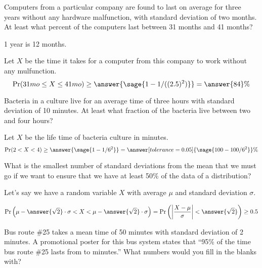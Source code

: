 \documentclass{ximera}
\begin{document}
\begin{problem}
Computers from a particular company are found to last on average for three years without any hardware malfunction, with standard deviation of two months. At least what percent of the computers last between 31 months and 41 months?
\begin{hint}
1 year is 12 months.
\end{hint}
\begin{prompt}
Let $X$ be the time it takes  for a computer from this company to work without any mulfunction.
$$\Pr(31mo\leq X \leq 41mo)\geq\answer{\sage{1 - 1/((2.5)^2)}}=\answer{84}\%$$

\end{prompt}
\end{problem}



\begin{problem}
Bacteria in a culture live for an average time of three hours with standard deviation of 10 minutes. At least what fraction of the bacteria live between two and four hours?
\begin{prompt}
Let $X$ be the life time of bacteria culture in minutes.
$$\Pr(2<X<4)\geq \answer{ \sage{1-1/6^2}}=\answer[tolerance=0.05]{ \sage{100-100/6^2}}\%$$
\end{prompt}
\end{problem}


\begin{problem}
What is the smallest number of standard deviations from the mean that we must go if we want to ensure that we have at least 50\% of the data of a distribution?
\begin{prompt}
Let's say we have a random variable $X$ with average $\mu$ and standard deviation $\sigma$. 

$$\Pr\left(\mu-\answer{\sqrt{2}}\cdot \sigma< X < \mu-\answer{\sqrt{2}}\cdot \sigma \right)=\Pr\left(\left|\frac{X-\mu}{\sigma}\right|<\answer{\sqrt{2}}\right)\geq 0.5 $$
\end{prompt}
\end{problem}

\begin{problem}

Bus route \#25 takes a mean time of 50 minutes with standard deviation of 2 minutes. A promotional poster for this bus system states that ``95\% of the time bus route \#25 lasts from  to  minutes.'' What numbers would you fill in the blanks with?
\end{problem}
\end{document}
